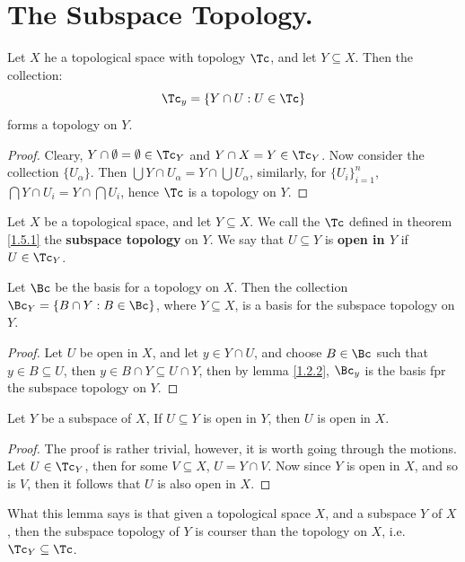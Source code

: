 
\section{The Subspace Topology.}

\begin{theorem}\label{1.5.1}
    Let $X$ he a topological space with topology $\Tc$, and let $Y \subseteq X$. Then the
    collection:
        \begin{equation*}
            \Tc_y = \{Y \cap U: U \in \Tc\}
        \end{equation*}
    forms a topology on $Y$.
\end{theorem}
\begin{proof}
    Cleary, $Y \cap \emptyset=\emptyset \in \Tc_Y$ and  $Y \cap X=Y \in \Tc_Y$. Now  consider the collection
    $\{U_{\alpha}\}$. Then  $\bigcup{Y \cap U_{\alpha}}=Y \cap \bigcup{U_{\alpha}}$, similarly, for  $\{U_i\}_{i=1}^n$,
    $\bigcap{Y \cap U_i}=Y \cap \bigcap{U_i}$, hence  $\Tc$ is a topology on  $Y$.
\end{proof}

\begin{definition}
    Let $X$ be a topological space, and let  $Y \subseteq X$. We call the $\Tc$ defined
    in theorem \ref{1.5.1} the \textbf{subspace topology} on $Y$. We say that $U \subseteq Y$ is
    \textbf{open in $Y$} if $U \in \Tc_Y$.
\end{definition}

\begin{lemma}\label{1.5.2}
    Let $\Bc$ be the basis for a topology on  $X$. Then the collection  $\Bc_Y=\{B \cap Y: B \in \Bc\}$,
    where  $Y \subseteq X$, is a basis for the subspace topology on  $Y$.
\end{lemma}
\begin{proof}
    Let $U$ be open in  $X$, and let  $y \in Y \cap U$, and choose  $B \in \Bc$ such that
    $y \in B \subseteq U$, then  $y \in B \cap Y \subseteq U \cap Y$, then by lemma \ref{1.2.2},
     $\Bc_y$ is the basis fpr the subspace topology on  $Y$.
\end{proof}

\begin{lemma}\label{1.5.3}
    Let $Y$ be a subspace of  $X$, If  $U \subseteq Y$ is open in  $Y$, then  $U$ is
    open in  $X$.
\end{lemma}
\begin{proof}
    The proof is rather trivial, however, it is worth going through the motions.
    Let $U \in \Tc_Y$, then for some  $V \subseteq X$,  $U=Y \cap V$. Now since  $Y$ is open in  $X$, and so
    is  $V$, then  it follows that $U$ is also open in  $X$.
\end{proof}
\begin{remark}
    What this lemma says is that given a topological space $X$, and a subspace  $Y$ of  $X$, then the
    subspace topology of  $Y$ is courser than the topology on  $X$, i.e.  $\Tc_Y \subseteq \Tc$.
\end{remark}

